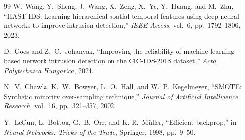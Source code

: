 \documentclass[12pt]{article}
\theoremstyle{plain}
\begin{document}
\begin{thebibliography}{99}
W.~Wang, Y.~Sheng, J.~Wang, X.~Zeng, X.~Ye, Y.~Huang, and M.~Zhu,
``HAST-IDS: Learning hierarchical spatial-temporal features using deep neural networks to improve intrusion detection,''
\textit{IEEE Access}, vol.~6, pp.~1792--1806, 2023.

D.~Gocs and Z.~C.~Johanyak,
``Improving the reliability of machine learning based network intrusion detection on the CIC-IDS-2018 dataset,''
\textit{Acta Polytechnica Hungarica}, 2024.

N.~V.~Chawla, K.~W.~Bowyer, L.~O.~Hall, and W.~P.~Kegelmeyer,
``SMOTE: Synthetic minority over-sampling technique,''
\textit{Journal of Artificial Intelligence Research}, vol.~16, pp.~321--357, 2002.

Y.~LeCun, L.~Bottou, G.~B.~Orr, and K.-R.~Müller,
``Efficient backprop,''
in \textit{Neural Networks: Tricks of the Trade}, Springer, 1998, pp.~9--50.

\end{thebibliography}
\end{document}
